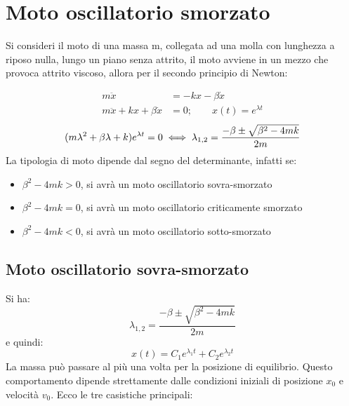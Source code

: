 \documentclass[11pt, a4paper, openright]{book}
\theoremstyle{plain}
\theoremstyle{definition}
\begin{document}
\section{Moto oscillatorio smorzato}
Si consideri il moto di una massa m, collegata ad una molla con lunghezza a riposo nulla, lungo un piano senza attrito, il moto avviene in un mezzo che provoca attrito viscoso, allora per il secondo principio di Newton:

\begin{align}
    m\ddot{x} & = -kx - \beta \dot x \\
    m\ddot{x} + kx + \beta \dot x & = 0; \quad \quad x(t) = e^{\lambda t}
\end{align}
\begin{equation*}
     \\
    (m\lambda^2 + \beta \lambda + k)e^{\lambda t} = 0 \iff \lambda_{1, 2} = \frac{-\beta \pm \sqrt{\beta^2 - 4mk}}{2m}
\end{equation*}
La tipologia di moto dipende dal segno del determinante, infatti se:
\begin{itemize}
    \item $\beta^2 - 4mk > 0$, si avrà un moto oscillatorio sovra-smorzato
    \item $\beta^2 - 4mk = 0$, si avrà un moto oscillatorio criticamente smorzato
    \item $\beta^2 - 4mk < 0$, si avrà un moto oscillatorio sotto-smorzato
\end{itemize}

\newpage

\subsection{Moto oscillatorio sovra-smorzato}
Si ha:
\[\lambda_{1, 2} = \frac{-\beta \pm \sqrt{\beta^2 - 4mk}}{2m}\]
e quindi:
\[x(t) = C_1e^{\lambda_1 t} + C_2e^{\lambda_2 t}\]
La massa può passare al più una volta per la posizione di equilibrio. Questo comportamento dipende strettamente dalle condizioni iniziali di posizione $x_0$ e velocità $v_0$. Ecco le tre casistiche principali:
\end{document}
